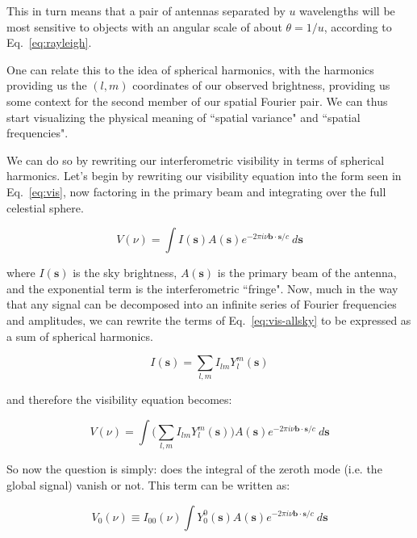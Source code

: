 This in turn means that a pair of antennas separated by $u$ wavelengths will be 
most sensitive to objects with an angular scale of about $\theta = 1 / u$, 
according to Eq.~\eqref{eq:rayleigh}.

One can relate this to the idea of spherical harmonics, with the harmonics 
providing us the $(l,m)$ coordinates of our observed brightness, providing us 
some context for the second member of our spatial Fourier pair. We can thus 
start visualizing the physical meaning of ``spatial variance" and ``spatial 
frequencies".

We can do so by rewriting our interferometric visibility in terms of spherical 
harmonics. Let's begin by rewriting our visibility equation into the form seen 
in Eq.~\eqref{eq:vis}, now factoring in the primary beam and integrating over 
the full celestial sphere.

\begin{equation}
    V(\nu) = \int I(\mathbf s) A(\mathbf{s}) e^{-2\pi i 
    \nu\mathbf{b}\cdot\mathbf{s}/c} ~d\mathbf{s}
    \label{eq:vis-allsky}
\end{equation}

\noindent where $I(\mathbf{s})$ is the sky brightness, $A(\mathbf{s})$ is the 
primary beam of the antenna, and the exponential term is the interferometric 
``fringe".  Now, much in the way that any signal can be decomposed into an 
infinite series of Fourier frequencies and amplitudes, we can rewrite the terms 
of Eq.~\eqref{eq:vis-allsky} to be expressed as a sum of spherical harmonics.

\begin{equation}
    I(\mathbf s) = \sum_{l,m} I_{lm} Y_l^m(\mathbf{s})
    \label{eq:sky-spherical-harmonics}
\end{equation}

\noindent and therefore the visibility equation becomes:

\begin{equation}
    V(\nu) = \int \Big( \sum_{l,m} I_{lm} Y_l^m(\mathbf{s}) \Big) A(\mathbf{s}) 
    e^{-2\pi i \nu\mathbf{b}\cdot\mathbf{s}/c} ~d\mathbf{s}
    \label{eq:vis-allsky-lm}
\end{equation}

So now the question is simply: does the integral of the zeroth mode (i.e. the 
global signal) vanish or not. This term can be written as:

\begin{equation}
    V_0(\nu) \equiv I_{00}(\nu) \int Y_0^0(\mathbf{s}) A(\mathbf{s}) e^{-2\pi i 
    \nu\mathbf{b}\cdot\mathbf{s}/c} ~d\mathbf{s}
    \label{eq:vis-allsky-00}
\end{equation}

